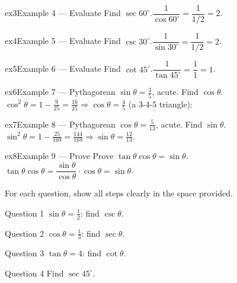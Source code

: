\documentclass[11pt]{article}
\begin{document}
\begin{example}{ex3}{Example 4 --- Evaluate}
Find $\sec60^\circ$.\soln $\dfrac{1}{\cos60^\circ}=\dfrac{1}{1/2}=2$.
\end{example}

\begin{example}{ex4}{Example 5 --- Evaluate}
Find $\csc30^\circ$.\soln $\dfrac{1}{\sin30^\circ}=\dfrac{1}{1/2}=2$.
\end{example}

\begin{example}{ex5}{Example 6 --- Evaluate}
Find $\cot45^\circ$.\soln $\dfrac{1}{\tan45^\circ}=\dfrac11=1$.
\end{example}

\begin{example}{ex6}{Example 7 --- Pythagorean}
$\sin\theta=\tfrac35$, acute. Find $\cos\theta$.\soln $\cos^2\theta=1-\tfrac{9}{25}=\tfrac{16}{25}\Rightarrow\cos\theta=\tfrac45$ (a 3-4-5 triangle):
\end{example}

\begin{example}{ex7}{Example 8 --- Pythagorean}
$\cos\theta=\tfrac{5}{13}$, acute. Find $\sin\theta$.\soln $\sin^2\theta=1-\tfrac{25}{169}=\tfrac{144}{169}\Rightarrow\sin\theta=\tfrac{12}{13}$.
\end{example}

\begin{example}{ex8}{Example 9 --- Prove}
Prove $\tan\theta\cos\theta=\sin\theta$.\soln $\tan\theta\cos\theta=\dfrac{\sin\theta}{\cos\theta}\cdot\cos\theta=\sin\theta$. \checkmark
\end{example}

\clearpage
{}
For each question, show all steps clearly in the space provided.

\begin{qbox}{Question 1}
$\sin\theta=\tfrac12$: find $\csc\theta$.\workspace{2.4cm}
\end{qbox}

\begin{qbox}{Question 2}
$\cos\theta=\tfrac13$: find $\sec\theta$.\workspace{2.4cm}
\end{qbox}

\begin{qbox}{Question 3}
$\tan\theta=4$: find $\cot\theta$.\workspace{2.4cm}
\end{qbox}

\begin{qbox}{Question 4}
Find $\sec45^\circ$.\workspace{2.4cm}
\end{qbox}
\end{document}
